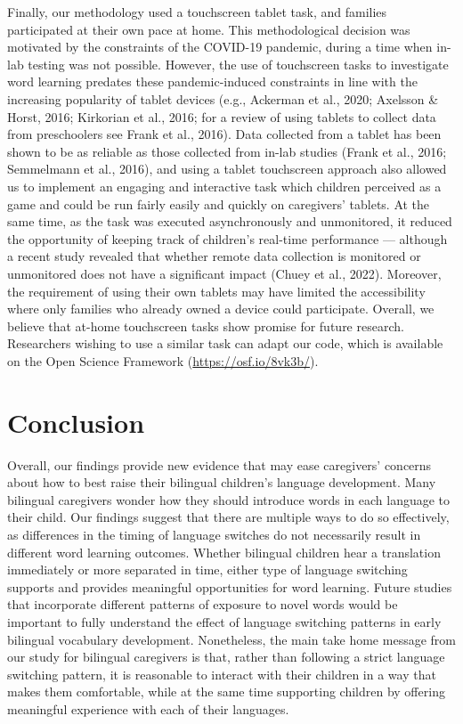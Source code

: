 \documentclass[
  man,floatsintext]{apa7}
\begin{document}
Finally, our methodology used a touchscreen tablet task, and families participated at their own pace at home. This methodological decision was motivated by the constraints of the COVID-19 pandemic, during a time when in-lab testing was not possible. However, the use of touchscreen tasks to investigate word learning predates these pandemic-induced constraints in line with the increasing popularity of tablet devices (e.g., Ackerman et al., 2020; Axelsson \& Horst, 2016; Kirkorian et al., 2016; for a review of using tablets to collect data from preschoolers see Frank et al., 2016). Data collected from a tablet has been shown to be as reliable as those collected from in-lab studies (Frank et al., 2016; Semmelmann et al., 2016), and using a tablet touchscreen approach also allowed us to implement an engaging and interactive task which children perceived as a game and could be run fairly easily and quickly on caregivers' tablets. At the same time, as the task was executed asynchronously and unmonitored, it reduced the opportunity of keeping track of children's real-time performance --- although a recent study revealed that whether remote data collection is monitored or unmonitored does not have a significant impact (Chuey et al., 2022). Moreover, the requirement of using their own tablets may have limited the accessibility where only families who already owned a device could participate. Overall, we believe that at-home touchscreen tasks show promise for future research. Researchers wishing to use a similar task can adapt our code, which is available on the Open Science Framework (\url{https://osf.io/8vk3b/}).

\hypertarget{conclusion}{%
\section{Conclusion}\label{conclusion}}

Overall, our findings provide new evidence that may ease caregivers' concerns about how to best raise their bilingual children's language development. Many bilingual caregivers wonder how they should introduce words in each language to their child. Our findings suggest that there are multiple ways to do so effectively, as differences in the timing of language switches do not necessarily result in different word learning outcomes. Whether bilingual children hear a translation immediately or more separated in time, either type of language switching supports and provides meaningful opportunities for word learning. Future studies that incorporate different patterns of exposure to novel words would be important to fully understand the effect of language switching patterns in early bilingual vocabulary development. Nonetheless, the main take home message from our study for bilingual caregivers is that, rather than following a strict language switching pattern, it is reasonable to interact with their children in a way that makes them comfortable, while at the same time supporting children by offering meaningful experience with each of their languages.
\end{document}
